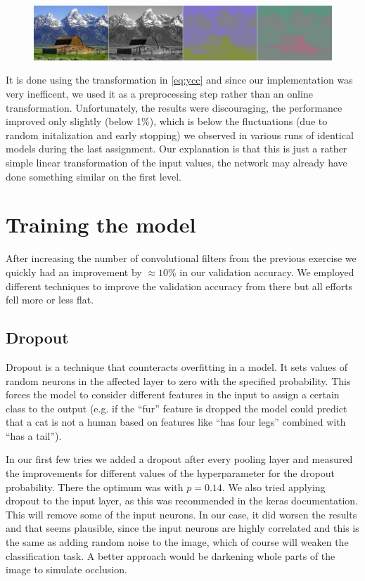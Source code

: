 \begin{figure}\centering
\includegraphics[width=1\textwidth]{./img/barn_rgb_ycc.jpg}

\end{figure}

It is done using the transformation in \eqref{eq:ycc} and since our implementation was very inefficent, we used it as a preprocessing step rather than an online transformation. 
Unfortunately, the results were discouraging, the performance improved only slightly (below 1\%), which is below the fluctuations (due to random initalization and early stopping) we observed in various runs of identical models during the last assignment. Our explanation is that this is just a rather simple linear transformation of the input values, the network may already have done something similar on the first level. 




\section{Training the model}
After increasing the number of convolutional filters from the previous exercise we quickly had an improvement by $\approx 10\%$ in our validation accuracy. We employed different techniques to improve the validation accuracy from there but all efforts fell more or less flat. 

\subsection{Dropout}
Dropout is a technique that counteracts overfitting in a model. It sets values of random neurons in the affected layer to zero with the specified probability. This forces the model to consider different features in the input to assign a certain class to the output (e.g. if the ``fur'' feature is dropped the model could predict that a cat is not a human based on features like ``has four legs'' combined with ``has a tail''). 

In our first few tries we added a dropout after every pooling layer and measured the improvements for different values of the hyperparameter for the dropout probability. There the optimum was with $p=0.14$.
We also tried applying dropout to the input layer, as this was recommended in the keras documentation. This will remove some of the input neurons. In our case, it did worsen the results and that seems plausible, since the input neurons are highly correlated and this is the same as adding random noise to the image, which of course will weaken the classification task. A better approach would be darkening whole parts of the image to simulate occlusion.

